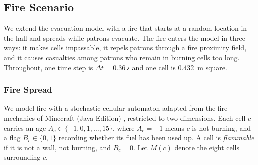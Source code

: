 
\subsection{Fire Scenario}\label{sec:fire}

We extend the evacuation model with a fire that starts at a random location in the
hall and spreads while patrons evacuate. The fire enters the model in three ways: it
makes cells impassable, it repels patrons through a fire proximity field, and it causes
casualties among patrons who remain in burning cells too long. Throughout, one time step
is $\Delta t = \SI{0.36}{s}$ and one cell is \SI{0.432}{m} square.

\subsubsection{Fire Spread}\label{sec:fire_spread}

We model fire with a stochastic cellular automaton adapted from the fire mechanics of
Minecraft (Java Edition) \cite{minecraftfire}, restricted to two dimensions. Each cell
$c$ carries an age $A_c \in \{-1, 0, 1, \dots, 15\}$, where $A_c = -1$ means $c$ is not
burning, and a flag $B_c \in \{0, 1\}$ recording whether its fuel has been used up. A cell
is \emph{flammable} if it is not a wall, not burning, and $B_c = 0$. Let $M(c)$ denote the
eight cells surrounding $c$.

